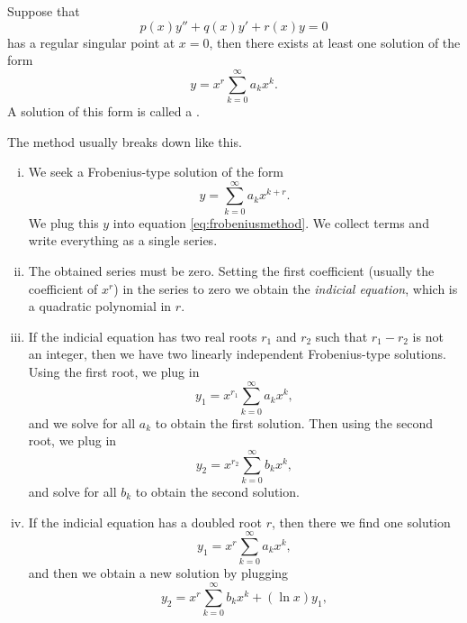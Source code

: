 \documentclass[12pt]{book}
\begin{document}
\begin{theorem}
Suppose that 
\begin{equation} \label{eq:frobeniusmethod}
p(x) y'' + q(x) y' + r(x) y = 0
\end{equation}
has a regular singular point at $x=0$, then there exists at least
one solution of the form
\begin{equation*}
y = x^r \sum_{k=0}^\infty a_k x^k .
\end{equation*}
A solution of this form is called a
\emph{}.
\end{theorem}

The method usually breaks down like this.

\begin{enumerate}[(i)]
\item
We seek a Frobenius-type solution of the form
\begin{equation*}
y = \sum_{k=0}^\infty a_k x^{k+r} .
\end{equation*}
We plug this $y$ into equation \eqref{eq:frobeniusmethod}.  We collect
terms and write everything as a single series.
\item
The obtained series must be zero.  Setting the first
coefficient (usually the coefficient of $x^r$) in the series
to zero we obtain the
\emph{indicial equation}, which is a quadratic polynomial in $r$.
\item
If the indicial equation has two real roots $r_1$ and $r_2$
such that $r_1 - r_2$ is not an integer, then we have two linearly
independent Frobenius-type solutions.  Using the first root, we plug in
\begin{equation*}
y_1 = x^{r_1} \sum_{k=0}^\infty a_k x^{k} ,
\end{equation*}
and we solve for all $a_k$ to obtain the first solution.  Then
using the second root,
we plug in
\begin{equation*}
y_2 = x^{r_2} \sum_{k=0}^\infty b_k x^{k} ,
\end{equation*}
and solve for all $b_k$ to obtain the second solution.
\item
If the indicial equation has a doubled root $r$, then there we find 
one solution
\begin{equation*}
y_1 = x^{r} \sum_{k=0}^\infty a_k x^{k} ,
\end{equation*}
and then we obtain a new solution by plugging
\begin{equation*}
y_2 = x^{r} \sum_{k=0}^\infty b_k x^{k} + (\ln x) y_1 ,
\end{equation*}

\end{enumerate}
\end{document}
